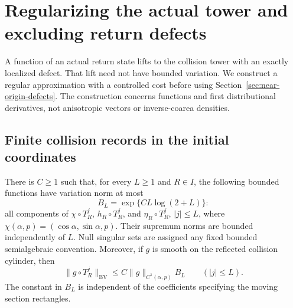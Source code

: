 \section{Regularizing the actual tower and excluding return defects}
\label{sec:actual-return-defects}
A function of an actual return state lifts to the collision tower with
an exactly localized defect. That lift need not have bounded variation.
We construct a regular approximation with a controlled cost before
using Section~\ref{sec:near-origin-defects}. The construction concerns
functions and first distributional derivatives, not anisotropic
vectors or inverse-coarea densities.

\subsection{Finite collision records in the initial coordinates}
\begin{lemma}
\label{lem:finite-record-variation}
There is $C\ge1$ such that, for every $L\ge1$ and $R\in I$, the
following bounded functions have variation norm at most
\begin{equation}\label{eq:finite-record-variation-budget}
 B_L=\exp\{C L\log(2+L)\}:
\end{equation}
all components of
$\chi\circ T_R^j$, $h_R\circ T_R^j$, and $\eta_R\circ T_R^j$,
$|j|\le L$, where $\chi(\alpha,p)=(\cos\alpha,\sin\alpha,p)$.
Their supremum norms are bounded independently of $L$. Null singular
sets are assigned any fixed bounded semialgebraic convention.
Moreover, if $g$ is smooth on the reflected collision cylinder, then
\begin{equation}\label{eq:finite-record-smooth-composition}
 \|g\circ T_R^j\|_{\mathrm{BV}}
              \le C\|g\|_{C^1(\alpha,p)}B_L\qquad(|j|\le L).
\end{equation}
The constant in $B_L$ is independent of the coefficients specifying
the moving section rectangles.
\end{lemma}
